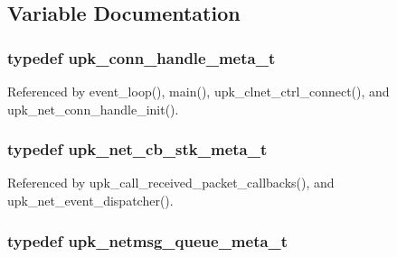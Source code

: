 \subsection{Variable Documentation}
\subsubsection[{upk\_\-conn\_\-handle\_\-meta\_\-t}]{\setlength{\rightskip}{0pt plus 5cm}typedef {\bf upk\_\-conn\_\-handle\_\-meta\_\-t}}\label{group__upk__network_ga64ae05a2acaefbc2d0cb8106b209c981}


Referenced by event\_\-loop(), main(), upk\_\-clnet\_\-ctrl\_\-connect(), and upk\_\-net\_\-conn\_\-handle\_\-init().

\subsubsection[{upk\_\-net\_\-cb\_\-stk\_\-meta\_\-t}]{\setlength{\rightskip}{0pt plus 5cm}typedef {\bf upk\_\-net\_\-cb\_\-stk\_\-meta\_\-t}}\label{group__upk__network_gadd690d14f14702fc03894ce04e150458}


Referenced by upk\_\-call\_\-received\_\-packet\_\-callbacks(), and upk\_\-net\_\-event\_\-dispatcher().

\subsubsection[{upk\_\-netmsg\_\-queue\_\-meta\_\-t}]{\setlength{\rightskip}{0pt plus 5cm}typedef {\bf upk\_\-netmsg\_\-queue\_\-meta\_\-t}}\label{group__upk__network_gac998706432365d99ac53c9880147b585}
